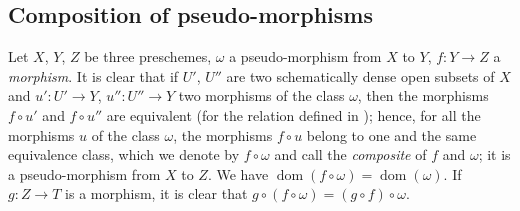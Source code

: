 \subsection{Composition of pseudo-morphisms}

\begin{env}[20.3.1]\label{IV.20.3.1}
Let $X$, $Y$, $Z$ be three preschemes, $\omega$ a pseudo-morphism from $X$ to $Y$, $f:Y\to Z$ a \emph{morphism}.
It is clear that if $U'$, $U''$ are two schematically dense open subsets of $X$ and $u':U'\to Y$, $u'':U''\to Y$ two morphisms of the class $\omega$, then the morphisms $f\circ u'$ and $f\circ u''$ are equivalent (for the relation defined in ); hence, for all the morphisms $u$ of the class $\omega$, the morphisms $f\circ u$ belong to one and the same equivalence class, which we denote by $f\circ\omega$ and call the \emph{composite} of $f$ and $\omega$; it is a pseudo-morphism from $X$ to $Z$.
We have $\operatorname{dom}(f\circ\omega)=\operatorname{dom}(\omega)$.
If $g:Z\to T$ is a morphism, it is clear that $g\circ(f\circ\omega)=(g\circ f)\circ\omega$.
\end{env}

